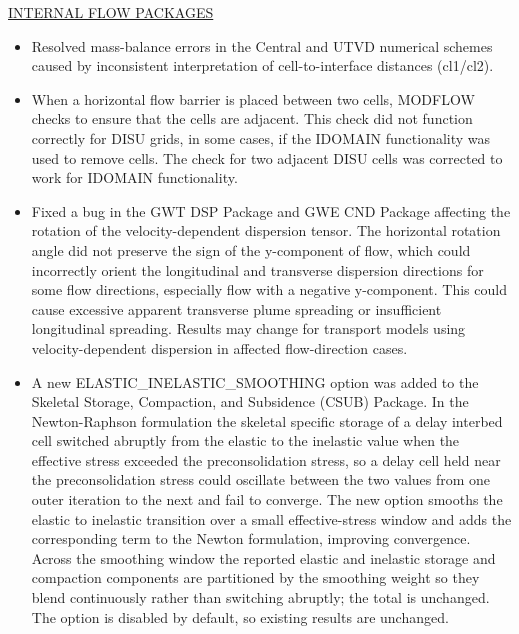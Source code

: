 \underline{INTERNAL FLOW PACKAGES}
\begin{itemize}
\item Resolved mass-balance errors in the Central and UTVD numerical schemes caused by inconsistent interpretation of cell-to-interface distances (cl1/cl2).
\item When a horizontal flow barrier is placed between two cells, MODFLOW checks to ensure that the cells are adjacent.  This check did not function correctly for DISU grids, in some cases, if the IDOMAIN functionality was used to remove cells.  The check for two adjacent DISU cells was corrected to work for IDOMAIN functionality.
\item Fixed a bug in the GWT DSP Package and GWE CND Package affecting the rotation of the velocity-dependent dispersion tensor. The horizontal rotation angle did not preserve the sign of the y-component of flow, which could incorrectly orient the longitudinal and transverse dispersion directions for some flow directions, especially flow with a negative y-component. This could cause excessive apparent transverse plume spreading or insufficient longitudinal spreading. Results may change for transport models using velocity-dependent dispersion in affected flow-direction cases.
\item A new ELASTIC\_INELASTIC\_SMOOTHING option was added to the Skeletal Storage, Compaction, and Subsidence (CSUB) Package. In the Newton-Raphson formulation the skeletal specific storage of a delay interbed cell switched abruptly from the elastic to the inelastic value when the effective stress exceeded the preconsolidation stress, so a delay cell held near the preconsolidation stress could oscillate between the two values from one outer iteration to the next and fail to converge. The new option smooths the elastic to inelastic transition over a small effective-stress window and adds the corresponding term to the Newton formulation, improving convergence. Across the smoothing window the reported elastic and inelastic storage and compaction components are partitioned by the smoothing weight so they blend continuously rather than switching abruptly; the total is unchanged. The option is disabled by default, so existing results are unchanged.
\end{itemize}

